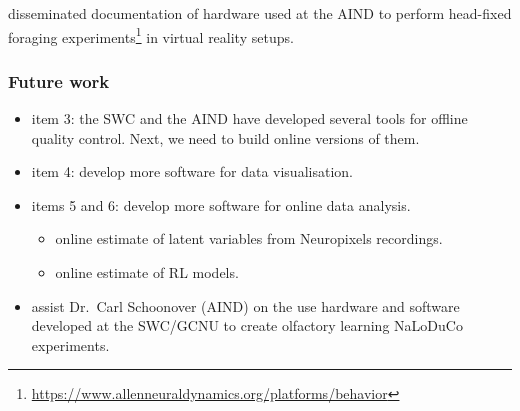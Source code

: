 \begin{frame}
\begin{itemize}
{\begin{itemize}
        \end{itemize}

        \item  disseminated documentation of hardware used at the AIND to perform
            head-fixed foraging
            experiments\footnote{\url{https://www.allenneuraldynamics.org/platforms/behavior}}
            in virtual reality setups.
        }
    \end{itemize}

\end{frame}

\begin{frame}
    \frametitle{Future work}

    \begin{itemize}

        \item item 3: the SWC and the AIND have developed several
        tools for offline quality control. Next, we need to build online
        versions of them.

        \item item 4: develop more software for data visualisation.

        \item items 5 and 6: develop more software for online data analysis.

        \begin{itemize}

            \item online estimate of latent variables from Neuropixels
            recordings.

            \item online estimate of RL models.

        \end{itemize}

        \item assist Dr.~Carl Schoonover (AIND) on the use hardware and
        software developed at the SWC/GCNU to create olfactory learning
        NaLoDuCo experiments.

    \end{itemize}

\end{frame}

